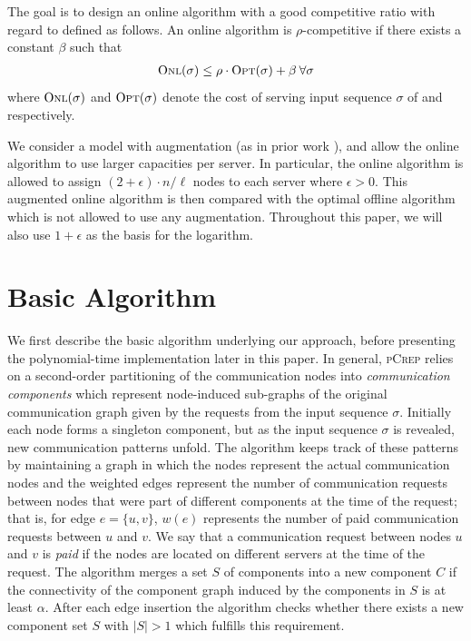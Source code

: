 \documentclass[a4paper,UKenglish,cleveref, autoref, thm-restate,authorcolumns]{lipics-v2019}
\newcommand{\adjDel}{\textsc{pCrep}}
\newcommand{\opt}{\text{O{\scriptsize PT}}}
\newcommand{\onl}{\text{O{\scriptsize NL}}}
\begin{document}
The goal is to design an online algorithm \onl{} with a good competitive ratio with regard to \opt{} defined as follows.
An online algorithm \onl{} is $\rho$-competitive if there exists a constant $\beta$ such that 
\begin{align*}
\onl{}(\sigma)\leq\rho\cdot \opt{}(\sigma)+\beta\:\forall \sigma
\end{align*} 
where $\onl{}(\sigma)$ and $\opt{}(\sigma)$ denote the cost of serving input sequence $\sigma$ of \onl{} and \opt{} respectively.

We consider a model with augmentation (as in prior work \cite{Avin2016}),
and allow the online algorithm to use larger capacities per server. 
In particular, the online algorithm is allowed to assign $(2+\epsilon)\cdot n/\ell$ nodes to each server where $\epsilon>0$. 
This augmented online algorithm is then compared with the optimal offline algorithm \opt{} which is not allowed to use any augmentation.
%
Throughout this paper, 
we will also use $1+\epsilon$ as the basis for the logarithm.

\section{Basic Algorithm}
\label{algIdeas}

We first describe the basic algorithm underlying
our approach, before presenting the polynomial-time implementation
later in this paper.
In general, \adjDel{} relies on a second-order partitioning of the communication nodes into \textit{communication components} which represent node-induced sub-graphs of the original communication graph given by the requests from the input sequence $\sigma$. 
Initially each node forms a singleton component, but as the input sequence $\sigma$ is revealed, new communication patterns unfold. The algorithm keeps track of these patterns by maintaining a graph in which the nodes represent the actual communication nodes and the weighted edges represent the number of communication requests between nodes that were part of different components at the time of the request; that is, 
for edge $e=\{u,v\}$, $w(e)$ represents the number of paid communication requests between $u$ and $v$. We say that a communication request between nodes $u$ and $v$ is \textit{paid} if the nodes are located on different servers at the time of the request.
The algorithm merges a set $S$ of components into a new component $C$ if the connectivity of the component graph induced by the components in $S$ is at least $\alpha$. After each edge insertion the algorithm checks whether there exists a new component set $S$ with $|S|>1$ which fulfills this requirement.
\end{document}
